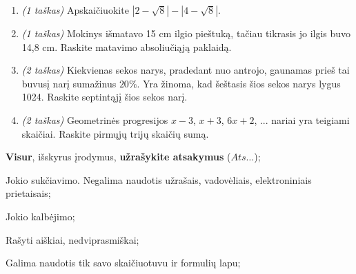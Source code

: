 \documentclass[a4paper]{article}
\begin{document}
\begin{enumerate}
      \item \textit{(1 taškas)} Apskaičiuokite
            $\left|2-\sqrt{8}\right|-\left|4-\sqrt{8}\right|$.
            \vspace{7mm}

      \item \textit{(1 taškas)} Mokinys išmatavo 15 cm ilgio pieštuką, tačiau
            tikrasis jo ilgis
            buvo
            14,8 cm. Raskite matavimo absoliučiąją paklaidą.
            \vspace{7mm}

      \item \textit{(2 taškas)} Kiekvienas sekos narys, pradedant nuo antrojo,
            gaunamas prieš
            tai
            buvusį narį sumažinus $20\%$. Yra žinoma, kad šeštasis šios sekos
            narys lygus
            1024. Raskite septintąjį šios sekos narį.
            \vspace{8mm}

      \item \textit{(2 taškas)} Geometrinės progresijos $x-3$, $x+3$, $6x+2$,
            ... nariai yra
            teigiami skaičiai. Raskite pirmųjų trijų skaičių sumą.
            \vspace{7mm}

\end{enumerate}

\begin{small}
      \begin{enumerate*}[label={(\arabic*)}, topsep=0pt, partopsep=0pt]
            \item \textbf{Visur}, išskyrus įrodymus, \textbf{užrašykite
                  atsakymus} ($Ats\ldots$);
            \item Jokio sukčiavimo. Negalima naudotis užrašais, vadovėliais,
            elektroniniais prietaisais;
            \item Jokio kalbėjimo;
            \item Rašyti aiškiai, nedviprasmiškai;
            \item Galima naudotis tik savo skaičiuotuvu ir formulių lapu;
      \end{enumerate*}
\end{small}



\def\width{19}
\def\hauteur{28}

\end{document}
